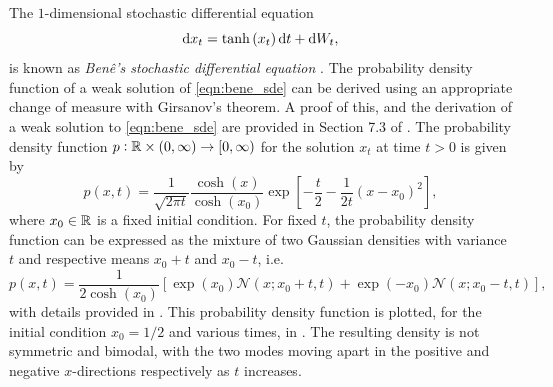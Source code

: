 \begin{example}\label{ex:bene_sde}
	The \(1\)-dimensional stochastic differential equation
	\begin{equation}
		\sde{x_t}{\tanh\left(x_t\right)}{},
		\label{eqn:bene_sde}
	\end{equation}
	is known as \emph{Ben\^e's stochastic differential equation} \citep{SarkkaSolin_2019_AppliedStochasticDifferential}.
	The probability density function of a weak solution of \eqref{eqn:bene_sde} can be derived using an appropriate change of measure with Girsanov's theorem.
	A proof of this, and the derivation of a weak solution to \eqref{eqn:bene_sde} are provided in Section 7.3 of \citet{SarkkaSolin_2019_AppliedStochasticDifferential}.
	The probability density function \(p: \mathbb{R} \times \left(0,\infty\right) \to \left[0,\infty\right)\) for the solution \(x_t\) at time \(t > 0\) is given by
	\begin{equation}\label{eqn:bene_sde_pdf}
		p(x,t) = \frac{1}{\sqrt{2\pi t}}\frac{\cosh\left(x\right)}{\cosh\left(x_0\right)}\exp\left[-\frac{t}{2} - \frac{1}{2t}\left(x - x_0\right)^2\right],
	\end{equation}
	where \(x_0 \in \mathbb{R}\) is a fixed initial condition.
	For fixed \(t\), the probability density function can be expressed as the mixture of two Gaussian densities with variance \(t\) and respective means \(x_0 + t\) and \(x_0 - t\), i.e.
	\[
		p(x,t) = \frac{1}{2\cosh\left(x_0\right)}\left[\exp\left(x_0\right)\mathcal{N}\!\left(x; x_0 + t, t\right) + \exp\left(-x_0\right)\mathcal{N}\!\left(x; x_0 - t, t\right)\right],
	\]
	with details provided in .
	This probability density function is plotted, for the initial condition \(x_0 = 1/2\) and various times, in .
	The resulting density is not symmetric and bimodal, with the two modes moving apart in the positive and negative \(x\)-directions respectively as \(t\) increases.
\end{example}


\newcommand{\plotbenepdf}[2]{
	\begin{tikzpicture}\begin{axis}[
				ymin=0.0,
				xmin=-10.0,
				xmax=10.0,
				axis lines=center,
				axis on top=true,
				domain=-10:10,
				ylabel=$p$,
				xlabel=$x$,
				ytick=\empty,
				yticklabels={},
			]
			\addplot [mark=none,draw=black,thick,samples=500] {cosh(\x)*exp(-#2/2-1/(2 * #2)*(\x-#1)^2)/((2 * pi * #2)^(1/2) * cosh(#1))};
		\end{axis}
	\end{tikzpicture}
}

